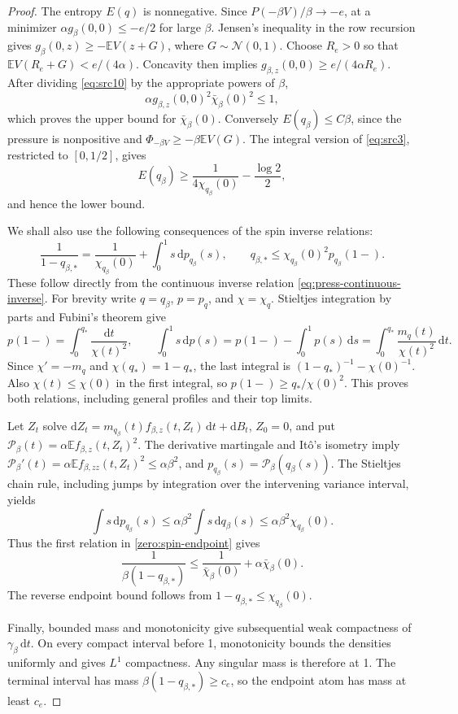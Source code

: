 \documentclass[11pt,a4paper]{article}
\numberwithin{equation}{section}
\theoremstyle{definition}
\theoremstyle{remark}
\newcommand{\E}{\mathbb E}
\newcommand{\dd}{\mathrm d}
\newcommand{\cN}{\mathcal N}
\providecommand{\mathscr}[1]{\mathcal{#1}}
\begin{document}
\begin{proof}
The entropy \(E(q)\) is nonnegative.  Since
\(P(-\beta V)/\beta\to-e\), at a minimizer
\(\alpha g_\beta(0,0)\le-e/2\) for large \(\beta\).
Jensen's inequality in the row recursion gives
\(g_\beta(0,z)\ge-\E V(z+G)\), where \(G\sim\cN(0,1)\).
Choose \(R_e>0\) so that \(\E V(R_e+G)<e/(4\alpha)\).
Concavity then implies
\(g_{\beta,z}(0,0)\ge e/(4\alpha R_e)\).
After dividing \eqref{eq:src10} by the appropriate powers of \(\beta\),
\[
 \alpha g_{\beta,z}(0,0)^2\bar\chi_\beta(0)^2\le1,
\]
which proves the upper bound for \(\bar\chi_\beta(0)\).
Conversely \(E(q_\beta)\le C\beta\), since the pressure is nonpositive
and \(\Phi_{-\beta V}\ge-\beta\E V(G)\).  The integral version of
\eqref{eq:src3}, restricted to \([0,1/2]\), gives
\[
 E(q_\beta)\ge\frac1{4\chi_{q_\beta}(0)}-\frac{\log2}{2},
\]
and hence the lower bound.

We shall also use the following consequences of the spin inverse
relations:
\begin{equation}\label{zero:spin-endpoint}
 \frac1{1-q_{\beta,*}}
 =\frac1{\chi_{q_\beta}(0)}+\int_0^1 s\,\dd p_{q_\beta}(s),
 \qquad
 q_{\beta,*}\le\chi_{q_\beta}(0)^2p_{q_\beta}(1-).
\end{equation}
These follow directly from the continuous inverse relation
\eqref{eq:press-continuous-inverse}.  For brevity write $q=q_\beta$,
$p=p_q$, and $\chi=\chi_q$.  Stieltjes integration by parts and
Fubini's theorem give
\[
 p(1-)=\int_0^{q_*}\frac{\dd t}{\chi(t)^2},\qquad
 \int_0^1s\,\dd p(s)
 =p(1-)-\int_0^1p(s)\,\dd s
 =\int_0^{q_*}\frac{m_q(t)}{\chi(t)^2}\,\dd t.
\]
Since $\chi'=-m_q$ and $\chi(q_*)=1-q_*$, the last integral is
$(1-q_*)^{-1}-\chi(0)^{-1}$.  Also $\chi(t)\le\chi(0)$ in the
first integral, so $p(1-)\ge q_*/\chi(0)^2$.  This proves both
relations, including general profiles and their top limits.

Let \(Z_t\) solve
\(\dd Z_t=m_{q_\beta}(t)f_{\beta,z}(t,Z_t)\,\dd t+\dd B_t\),
\(Z_0=0\), and put
\(\mathscr P_\beta(t)=\alpha\E f_{\beta,z}(t,Z_t)^2\).
The derivative martingale and It\^o's isometry imply
\(\mathscr P_\beta'(t)=\alpha\E f_{\beta,zz}(t,Z_t)^2\le\alpha\beta^2\),
and \(p_{q_\beta}(s)=\mathscr P_\beta(q_\beta(s))\).
The Stieltjes chain rule, including jumps by integration over the
intervening variance interval, yields
\[
 \int s\,\dd p_{q_\beta}(s)
 \le\alpha\beta^2\int s\,\dd q_\beta(s)
 \le\alpha\beta^2\chi_{q_\beta}(0).
\]
Thus the first relation in \eqref{zero:spin-endpoint} gives
\[
 \frac1{\beta(1-q_{\beta,*})}
 \le\frac1{\bar\chi_\beta(0)}+\alpha\bar\chi_\beta(0).
\]
The reverse endpoint bound follows from
\(1-q_{\beta,*}\le\chi_{q_\beta}(0)\).

Finally, bounded mass and monotonicity give subsequential weak
compactness of \(\gamma_\beta\,\dd t\).  On every compact interval
before 1, monotonicity bounds the densities uniformly and gives
\(L^1\) compactness.  Any singular mass is therefore at 1.
The terminal interval has mass \(\beta(1-q_{\beta,*})\ge c_e\),
so the endpoint atom has mass at least \(c_e\).
\end{proof}
\end{document}
